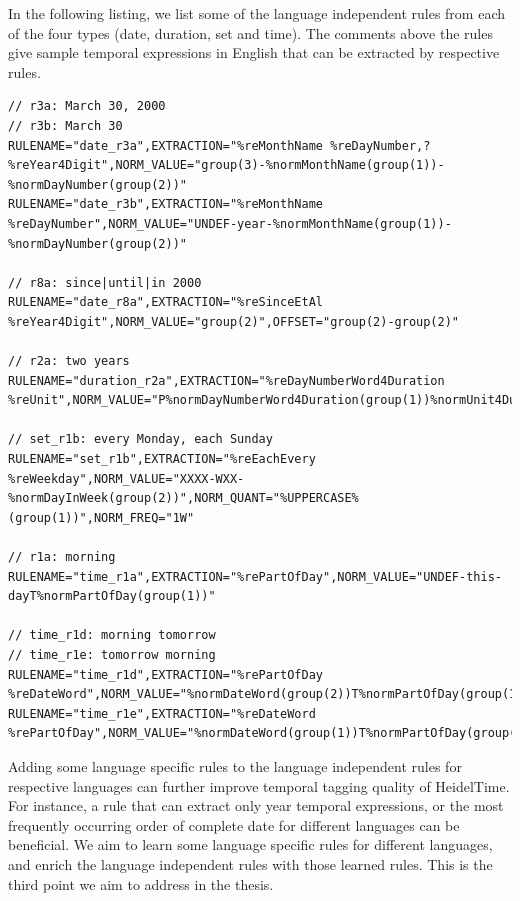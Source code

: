 In the following listing, we list some of the language independent rules from each of the four types (date, duration, set and time). The comments above the rules give sample temporal expressions in English that can be extracted by respective rules. \\

\begin{minipage}{\linewidth}
\begin{lstlisting}
// r3a: March 30, 2000
// r3b: March 30
RULENAME="date_r3a",EXTRACTION="%reMonthName %reDayNumber,? %reYear4Digit",NORM_VALUE="group(3)-%normMonthName(group(1))-%normDayNumber(group(2))"
RULENAME="date_r3b",EXTRACTION="%reMonthName %reDayNumber",NORM_VALUE="UNDEF-year-%normMonthName(group(1))-%normDayNumber(group(2))"

// r8a: since|until|in 2000
RULENAME="date_r8a",EXTRACTION="%reSinceEtAl %reYear4Digit",NORM_VALUE="group(2)",OFFSET="group(2)-group(2)"

// r2a: two years
RULENAME="duration_r2a",EXTRACTION="%reDayNumberWord4Duration %reUnit",NORM_VALUE="P%normDayNumberWord4Duration(group(1))%normUnit4Duration(group(2))"

// set_r1b: every Monday, each Sunday
RULENAME="set_r1b",EXTRACTION="%reEachEvery %reWeekday",NORM_VALUE="XXXX-WXX-%normDayInWeek(group(2))",NORM_QUANT="%UPPERCASE%(group(1))",NORM_FREQ="1W"

// r1a: morning
RULENAME="time_r1a",EXTRACTION="%rePartOfDay",NORM_VALUE="UNDEF-this-dayT%normPartOfDay(group(1))"

// time_r1d: morning tomorrow
// time_r1e: tomorrow morning 
RULENAME="time_r1d",EXTRACTION="%rePartOfDay %reDateWord",NORM_VALUE="%normDateWord(group(2))T%normPartOfDay(group(1))"
RULENAME="time_r1e",EXTRACTION="%reDateWord %rePartOfDay",NORM_VALUE="%normDateWord(group(1))T%normPartOfDay(group(2))"
\end{lstlisting}
\end{minipage}

Adding some language specific rules to the language independent rules for respective languages can further improve temporal tagging quality of HeidelTime. For instance, a rule that can extract only year temporal expressions, or the most frequently occurring order of complete date for different languages can be beneficial. We aim to learn some language specific rules for different languages, and enrich the language independent rules with those learned rules. This is the third point we aim to address in the thesis.


